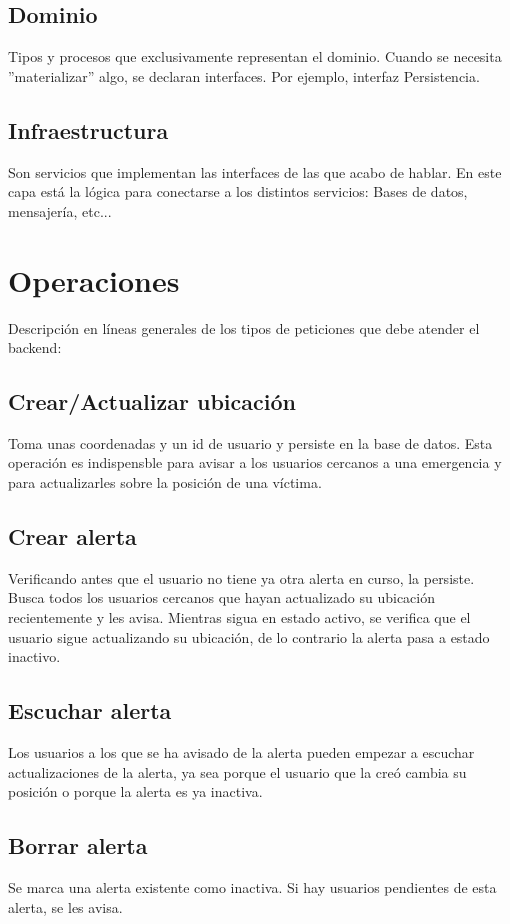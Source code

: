 \subsection{Dominio}
Tipos y procesos que exclusivamente representan el dominio.
Cuando se necesita ''materializar'' algo, se declaran interfaces. Por ejemplo, interfaz Persistencia.
\subsection{Infraestructura} 
Son servicios que implementan las interfaces de las que acabo de hablar.
En este capa está la lógica para conectarse a los distintos servicios: Bases de datos, mensajería, etc...

\section{Operaciones}

Descripción en líneas generales de los tipos de peticiones que debe atender el backend:

\subsection{Crear/Actualizar ubicación}
Toma unas coordenadas y un id de usuario y persiste en la base de datos.
Esta operación es indispensble para avisar a los usuarios cercanos a una emergencia y para 
actualizarles sobre la posición de una víctima.

\subsection{Crear alerta}
Verificando antes que el usuario no tiene ya otra alerta en curso, la persiste.
Busca todos los usuarios cercanos que hayan actualizado su ubicación recientemente y les avisa.
Mientras sigua en estado activo, se verifica que el usuario sigue actualizando su ubicación, de lo contrario la alerta pasa a estado inactivo.

\subsection{Escuchar alerta}
Los usuarios a los que se ha avisado de la alerta pueden empezar a escuchar actualizaciones de la alerta,
ya sea porque el usuario que la creó cambia su posición o porque la alerta es ya inactiva.

\subsection{Borrar alerta}
Se marca una alerta existente como inactiva. Si hay usuarios pendientes de esta alerta, se les avisa.


